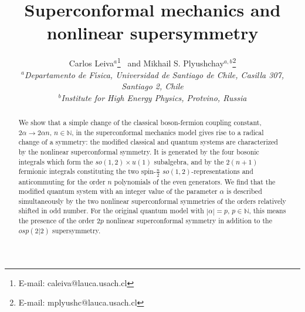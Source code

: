 \documentclass[a4paper,12pt]{article}
\def\N{\mathbb N}
\begin{document}
\title{
{\bf Superconformal mechanics and nonlinear
supersymmetry}}

\author{{\sf Carlos Leiva${}^{a}$}\thanks{
E-mail: caleiva@lauca.usach.cl}
{\sf\ and Mikhail S. Plyushchay${}^{a,b}$}\thanks{
E-mail: mplyushc@lauca.usach.cl}
\\
{\small {\it ${}^a$Departamento de F\'{\i}sica,
Universidad de Santiago de Chile,
Casilla 307, Santiago 2, Chile}}\\
{\small {\it ${}^b$Institute for High Energy Physics,
Protvino, Russia}}}
\date{}












\maketitle


\begin{abstract}
We show that a simple change of the classical
boson-fermion coupling
constant,
$2\alpha \rightarrow 2\alpha n $, $n\in \N$, in the
superconformal mechanics model
gives rise to a radical
change of a symmetry:
the modified classical and quantum
systems are characterized by the nonlinear
superconformal symmetry.
It is generated by
the four bosonic integrals
which form the $so(1,2)\times u(1)$ subalgebra,
and  by the $2(n+1)$ fermionic integrals
constituting the two
spin-$\frac{n}{2}$
$so(1,2)$-representations
and anticommuting for the order
$n$ polynomials of the even generators.
We find that the modified
quantum system with an integer
value of the parameter $\alpha$
is described simultaneously
by the two nonlinear superconformal
symmetries of the orders relatively shifted in odd number.
For the original
quantum model with $|\alpha|=p$, $p\in \N$,
this means the presence
of the order $2p$ nonlinear superconformal
symmetry in addition to the
$osp(2|2)$ supersymmetry.
\end{abstract}
\end{document}
